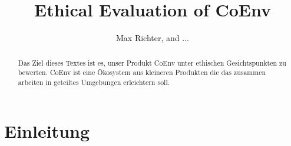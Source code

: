 \documentclass{article}
\title{Ethical Evaluation of CoEnv}
\author{Max Richter, and ...}
\begin{document}
\maketitle

\begin{abstract}
  Das Ziel dieses Textes ist es, unser Produkt CoEnv unter ethischen Gesichtspunkten zu bewerten. CoEnv ist eine Ökosystem aus kleineren Produkten die das zusammen arbeiten in geteiltes Umgebungen erleichtern soll.
\end{abstract}

\section{Einleitung}
\end{document}
